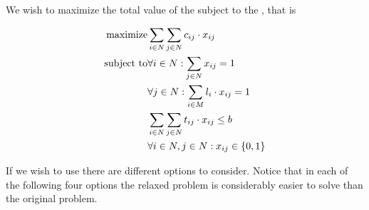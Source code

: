 We wish to maximize the total value of the  subject to the , that is

\begin{eqnarray}
\mbox{maximize}&\sumdomain[i]{N}{\sumdomain[j]{N}{c_{ij}\cdot x_{ij}}}\eqnlab{jobwork-m}\\
\mbox{subject to}&\forall i\in N:\sumdomain[j]{N}{x_{ij}}=1\eqnlab{jobwork-c1}\\
&\forall j\in N:\sumdomain[i]{M}{l_i\cdot x_{ij}}=1\eqnlab{jobwork-c2}\\
&\sumdomain[i]{N}{\sumdomain[j]{N}{t_{ij}\cdot x_{ij}}}\leq b\eqnlab{jobwork-c3}\\
&\forall i\in N,j\in N:x_{ij}\in\accl{0,1}\eqnlab{jobwork-c4}
\end{eqnarray}

If we wish to use  there are different options to consider. Notice that in each of the following four options the relaxed problem  is considerably easier to solve than the original problem.


